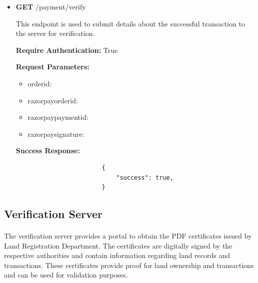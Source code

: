 \documentclass{article}
\begin{document}
\begin{itemize}
            \item \textbf{GET}  /payment/verify
                \begin{addmargin}[1em]{2em}%
                    This endpoint is used to submit details about the successful transaction to the server for verification.
                    \par\textbf{Require Authentication:} True
                    \par\textbf{Request Parameters:}
                    \begin{itemize}
                        \item order\textunderscore id:
                        \item razorpay\textunderscore order\textunderscore id:
                        \item razorpay\textunderscore payment\textunderscore id:
                        \item razorpay\textunderscore signature:
                    \end{itemize}
                    \par\textbf{Success Response:}
                    \begin{listing}[H]
                    \begin{verbatim}
                        {     
                            "success": true,
                        }
                    \end{verbatim}
                   \end{listing}
                \end{addmargin}
        
        \end{itemize}

    \subsection{Verification Server}
        \paragraph{}
        The verification server provides a portal to obtain the PDF certificates issued by Land Registration Department. The certificates are digitally signed by the respective authorities and contain information regarding land records and transactions. These certificates provide proof for land ownership and transactions and can be used for validation purposes.
        
\end{document}
